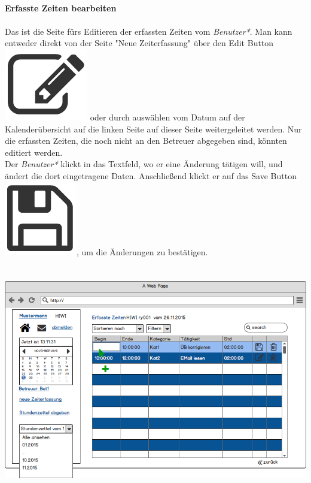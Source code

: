 \newpage
\textbf{\\Erfasste Zeiten bearbeiten}\\
\\
Das ist die Seite fürs Editieren der erfassten Zeiten vom \emph{Benutzer*}.
Man kann entweder direkt von der Seite "Neue Zeiterfassung" über den Edit Button \includegraphics[scale=.2]{UI/Button/Edit.png} oder durch auswählen vom Datum auf der Kalenderübersicht auf die linken Seite auf dieser Seite weitergeleitet werden. Nur die erfassten Zeiten, die noch nicht an den Betreuer abgegeben sind, könnten editiert werden.\\
Der \emph{Benutzer*} klickt in das Textfeld, wo er eine Änderung tätigen will, und ändert die dort eingetragene Daten. Anschließend klickt er auf das Save Button\includegraphics[scale=.2]{UI/Button/Save.png}, um die Änderungen zu bestätigen.\\
\\
\\
\includegraphics[width=\linewidth]{UI/Benutzer/Editieren.png}





